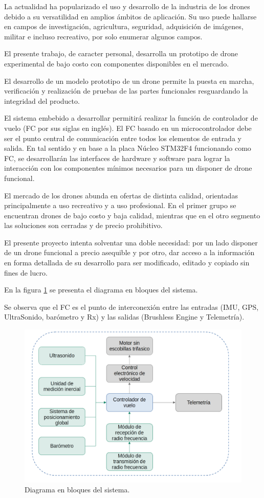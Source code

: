 \documentclass[
11pt, %
]{charter}
\begin{document}
	La actualidad ha popularizado el uso y desarrollo de la industria de los drones debido a su versatilidad en amplios ámbitos de aplicación. Su uso puede hallarse en campos de investigación, agricultura, seguridad, adquisición de imágenes, militar e incluso recreativo, por solo enumerar algunos campos.
	
	El presente trabajo, de caracter personal, desarrolla un prototipo de drone experimental de bajo costo con componentes disponibles en el mercado.

	El desarrollo de un modelo prototipo de un drone permite la puesta en marcha, verificación y realización de pruebas de las partes funcionales resguardando la integridad del producto.

	El sistema embebido a desarrollar permitirá realizar la función de controlador de vuelo (FC por sus siglas en inglés). El FC basado en un microcontrolador debe ser el punto central de comunicación entre todos los elementos de entrada y salida. En tal sentido y en base a la placa Núcleo STM32F4 funcionando como FC, se desarrollarán las interfaces de hardware y software para lograr la interacción con los componentes mínimos necesarios para un disponer de drone funcional.

	El mercado de los drones abunda en ofertas de distinta calidad, orientadas principalmente a uso recreativo y a uso profesional. En el primer grupo se encuentran drones de bajo costo y baja calidad, mientras que en el otro segmento las soluciones son cerradas y de precio prohibitivo. 
	
	El presente proyecto intenta solventar una doble necesidad: por un lado disponer de un drone funcional a precio asequible y por otro, dar acceso a la información en forma detallada de su desarrollo para ser modificado, editado y copiado sin fines de lucro. 
	

	En la figura \ref{fig:diagBloques} se presenta el diagrama en bloques del sistema. 
	
	Se observa que el FC es el punto de interconexión entre las entradas (IMU, GPS, UltraSonido, barómetro y Rx) y las salidas (Brushless Engine y Telemetría).

	\begin{figure}[htpb]
		\centering
		\includegraphics[width=.75\textwidth]{./Figuras/Diagrama_Bloques.png}
		\caption{Diagrama en bloques del sistema.}
		\label{fig:diagBloques}
	\end{figure}
\end{document}
